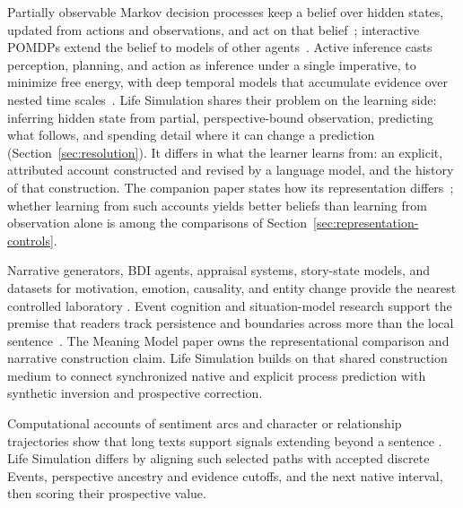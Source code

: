 \documentclass[10pt]{article}
\begin{document}
Partially observable Markov decision processes keep a belief over hidden
states, updated from actions and observations, and act on that
belief~\cite{kaelbling1998pomdp}; interactive POMDPs extend the belief to
models of other agents~\cite{gmytrasiewiczDoshi2005}. Active inference casts
perception, planning, and action as inference under a single imperative, to
minimize free energy, with deep temporal models that accumulate evidence over
nested time scales~\cite{parrPezzuloFriston2022,fristonEtAl2017deepTemporal}.
Life Simulation shares their problem on the learning side: inferring hidden
state from partial, perspective-bound observation, predicting what follows, and
spending detail where it can change a prediction (Section~\ref{sec:resolution}).
It differs in what the learner learns from: an explicit, attributed account
constructed and revised by a language model, and the history of that
construction. The companion paper states how its representation
differs~\cite{westerbergMeaning2026}; whether learning from such accounts yields
better beliefs than learning from observation alone is among the comparisons of
Section~\ref{sec:representation-controls}.

Narrative generators, BDI agents, appraisal systems, story-state models, and
datasets for motivation, emotion, causality, and entity change provide the
nearest controlled laboratory
\cite{riedl2010,raoGeorgeff1995,gebhard2005,rashkin2018,
mostafazadeh2020glucose,dalvi2018}. Event cognition and situation-model research
support the premise that readers track persistence and boundaries across more
than the local sentence~\cite{zacksEtAl2007event,zwaanRadvansky1998}. The
Meaning Model paper owns the representational comparison and narrative
construction claim. Life Simulation builds on that shared construction medium
to connect synchronized native and explicit process prediction with synthetic
inversion and prospective correction.

Computational accounts of sentiment arcs and character or relationship
trajectories show that long texts support signals extending beyond a sentence
\cite{jockers2015syuzhet,reagan2016arcs,iyyer2016relationships,
brahman2020emotion}. Life Simulation differs by aligning such selected paths
with accepted discrete Events, perspective ancestry and evidence cutoffs, and the next native
interval, then scoring their prospective value.
\end{document}
